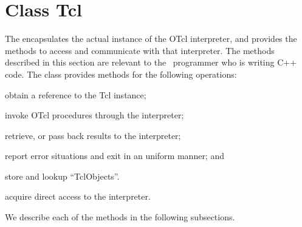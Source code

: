 \section{Class Tcl}
\label{sec:Tcl}

The  encapsulates the actual instance of
the OTcl interpreter, and provides the methods
to access and communicate with that interpreter.
The methods described in this section are relevant to the
\ns\ programmer who is writing C++ code.
The class provides methods for the following operations:
\begin{list}{\textbullet}{\itemsep0pt}
\item obtain a reference to the Tcl instance;
\item invoke OTcl procedures through the interpreter;
\item retrieve, or pass back results to the interpreter;
\item report error situations and exit in an uniform manner; and
\item store and lookup ``TclObjects''.
\item acquire direct access to the interpreter.
\end{list}
We describe each of the methods in the following subsections.

